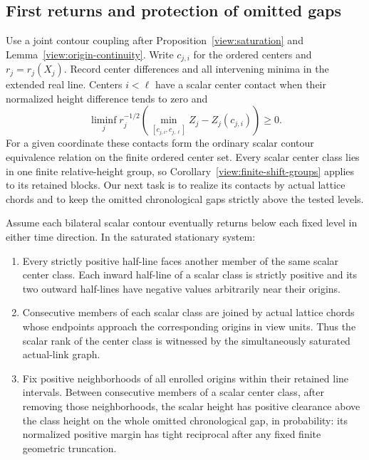 \subsection{First returns and protection of omitted gaps}

Use a joint contour coupling after Proposition~\ref{view:saturation} and
Lemma~\ref{view:origin-continuity}.  Write $c_{j,i}$ for the ordered
centers and $r_j=r_j(X_j)$.  Record center differences and all intervening
minima in the extended real line.  Centers $i<\ell$ have a scalar center
contact when their normalized height difference tends to zero and
\begin{equation}\label{view:center-contact}
 \liminf_j r_j^{-1/2}
 \left(\min_{[c_{j,i},c_{j,\ell}]}Z_j-Z_j(c_{j,i})\right)\ge0.
\end{equation}
For a given coordinate these contacts form the ordinary scalar contour
equivalence relation on the finite ordered center set.  Every scalar
center class lies in one finite relative-height group, so
Corollary~\ref{view:finite-shift-groups} applies to its retained blocks.
Our next task is to realize its contacts by actual lattice chords and
to keep the omitted chronological gaps strictly above the tested levels.

\begin{lemma}
\label{view:returns}
Assume each bilateral scalar contour eventually returns below each fixed
level in either time direction.  In the saturated stationary system:
\begin{enumerate}[label=(\roman*)]
\item Every strictly positive half-line faces another member of the same
scalar center class.  Each inward half-line of a scalar class is strictly
positive and its two outward half-lines have negative values arbitrarily
near their origins.
\item Consecutive members of each scalar class are joined by actual
lattice chords whose endpoints approach the corresponding origins in
view units.  Thus the scalar rank of the center class is witnessed by
the simultaneously saturated actual-link graph.
\item Fix positive neighborhoods of all enrolled origins within their
retained line intervals.  Between consecutive members of a scalar center
class, after removing those neighborhoods, the scalar height has positive
clearance above the class height on the whole omitted chronological gap,
in probability: its normalized positive margin has tight reciprocal
after any fixed finite geometric truncation.
\end{enumerate}
\end{lemma}

